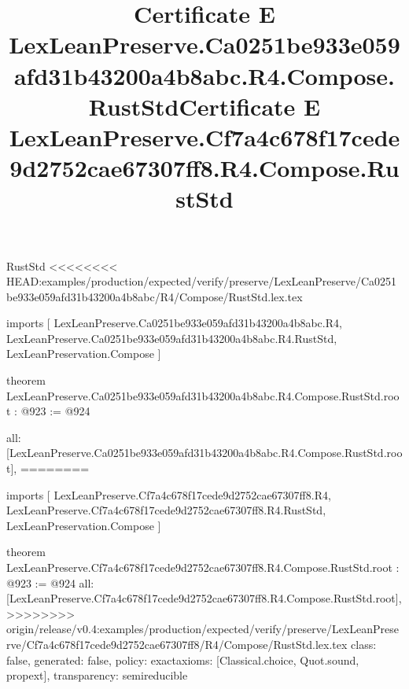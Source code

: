 \begin{lexlean}{RustStd}
<<<<<<<< HEAD:examples/production/expected/verify/preserve/LexLeanPreserve/Ca0251be933e059afd31b43200a4b8abc/R4/Compose/RustStd.lex.tex
\title{Certificate E LexLeanPreserve.Ca0251be933e059afd31b43200a4b8abc.R4.Compose.RustStd}
\begin{coremodule}
imports [
  LexLeanPreserve.Ca0251be933e059afd31b43200a4b8abc.R4,
  LexLeanPreserve.Ca0251be933e059afd31b43200a4b8abc.R4.RustStd,
  LexLeanPreservation.Compose
]

theorem LexLeanPreserve.Ca0251be933e059afd31b43200a4b8abc.R4.Compose.RustStd.root : @923 := @924 {
  all: [LexLeanPreserve.Ca0251be933e059afd31b43200a4b8abc.R4.Compose.RustStd.root],
========
\title{Certificate E LexLeanPreserve.Cf7a4c678f17cede9d2752cae67307ff8.R4.Compose.RustStd}
\begin{coremodule}
imports [
  LexLeanPreserve.Cf7a4c678f17cede9d2752cae67307ff8.R4,
  LexLeanPreserve.Cf7a4c678f17cede9d2752cae67307ff8.R4.RustStd,
  LexLeanPreservation.Compose
]

theorem LexLeanPreserve.Cf7a4c678f17cede9d2752cae67307ff8.R4.Compose.RustStd.root : @923 := @924 {
  all: [LexLeanPreserve.Cf7a4c678f17cede9d2752cae67307ff8.R4.Compose.RustStd.root],
>>>>>>>> origin/release/v0.4:examples/production/expected/verify/preserve/LexLeanPreserve/Cf7a4c678f17cede9d2752cae67307ff8/R4/Compose/RustStd.lex.tex
  class: false,
  generated: false,
  policy: exact{axioms: [Classical.choice, Quot.sound, propext]},
  transparency: semireducible
}


\end{coremodule}}
\end{coremodule}
\end{lexlean}
